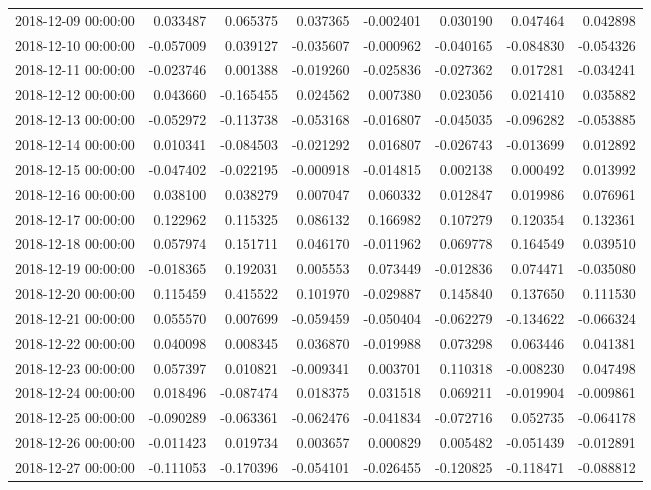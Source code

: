 \begin{tabular}{lrrrrrrr}
2018-12-09 00:00:00 & 0.033487 & 0.065375 & 0.037365 & -0.002401 & 0.030190 & 0.047464 & 0.042898 \\
2018-12-10 00:00:00 & -0.057009 & 0.039127 & -0.035607 & -0.000962 & -0.040165 & -0.084830 & -0.054326 \\
2018-12-11 00:00:00 & -0.023746 & 0.001388 & -0.019260 & -0.025836 & -0.027362 & 0.017281 & -0.034241 \\
2018-12-12 00:00:00 & 0.043660 & -0.165455 & 0.024562 & 0.007380 & 0.023056 & 0.021410 & 0.035882 \\
2018-12-13 00:00:00 & -0.052972 & -0.113738 & -0.053168 & -0.016807 & -0.045035 & -0.096282 & -0.053885 \\
2018-12-14 00:00:00 & 0.010341 & -0.084503 & -0.021292 & 0.016807 & -0.026743 & -0.013699 & 0.012892 \\
2018-12-15 00:00:00 & -0.047402 & -0.022195 & -0.000918 & -0.014815 & 0.002138 & 0.000492 & 0.013992 \\
2018-12-16 00:00:00 & 0.038100 & 0.038279 & 0.007047 & 0.060332 & 0.012847 & 0.019986 & 0.076961 \\
2018-12-17 00:00:00 & 0.122962 & 0.115325 & 0.086132 & 0.166982 & 0.107279 & 0.120354 & 0.132361 \\
2018-12-18 00:00:00 & 0.057974 & 0.151711 & 0.046170 & -0.011962 & 0.069778 & 0.164549 & 0.039510 \\
2018-12-19 00:00:00 & -0.018365 & 0.192031 & 0.005553 & 0.073449 & -0.012836 & 0.074471 & -0.035080 \\
2018-12-20 00:00:00 & 0.115459 & 0.415522 & 0.101970 & -0.029887 & 0.145840 & 0.137650 & 0.111530 \\
2018-12-21 00:00:00 & 0.055570 & 0.007699 & -0.059459 & -0.050404 & -0.062279 & -0.134622 & -0.066324 \\
2018-12-22 00:00:00 & 0.040098 & 0.008345 & 0.036870 & -0.019988 & 0.073298 & 0.063446 & 0.041381 \\
2018-12-23 00:00:00 & 0.057397 & 0.010821 & -0.009341 & 0.003701 & 0.110318 & -0.008230 & 0.047498 \\
2018-12-24 00:00:00 & 0.018496 & -0.087474 & 0.018375 & 0.031518 & 0.069211 & -0.019904 & -0.009861 \\
2018-12-25 00:00:00 & -0.090289 & -0.063361 & -0.062476 & -0.041834 & -0.072716 & 0.052735 & -0.064178 \\
2018-12-26 00:00:00 & -0.011423 & 0.019734 & 0.003657 & 0.000829 & 0.005482 & -0.051439 & -0.012891 \\
2018-12-27 00:00:00 & -0.111053 & -0.170396 & -0.054101 & -0.026455 & -0.120825 & -0.118471 & -0.088812 \\

\end{tabular}
